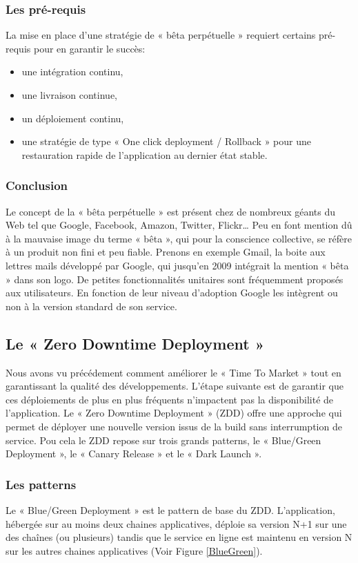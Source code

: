 \documentclass{report}
\begin{document}
        \subsubsection{Les pré-requis}
        La mise en place d’une stratégie de « bêta perpétuelle » requiert certains pré-requis pour en garantir le succès:\\
        \begin{itemize}
          \item une intégration continu,
          \item une livraison continue,
          \item un déploiement continu,
          \item une stratégie de type « One click deployment / Rollback » pour une restauration rapide de l’application au dernier état stable.\\
        \end{itemize}

        \subsubsection{Conclusion}
        Le concept de la « bêta perpétuelle » est présent chez de nombreux géants du Web tel que Google, Facebook, Amazon, Twitter, Flickr… Peu en font mention dû à la mauvaise image du terme « bêta », qui pour la conscience collective, se réfère à un produit non fini et peu fiable. Prenons en exemple Gmail, la boite aux lettres mails développé par Google, qui jusqu’en 2009 intégrait la mention « bêta » dans son logo. De petites fonctionnalités unitaires sont fréquemment proposés aux utilisateurs. En fonction de leur niveau d’adoption Google les intègrent ou non à la version standard de son service.

        \subsection{Le « Zero Downtime Deployment »}
        Nous avons vu précédement comment améliorer le « Time To Market » tout en garantissant la qualité des développements. L'étape suivante est de garantir que ces déploiements de plus en plus fréquents n'impactent pas la disponibilité de l'application. Le « Zero Downtime Deployment » (ZDD) offre une approche qui permet de déployer une nouvelle version issus de la build sans interrumption de service. Pou cela le ZDD repose sur trois grands patterns, le « Blue/Green Deployment », le « Canary Release » et le « Dark Launch ».
          \subsubsection{Les patterns}
          Le « Blue/Green Deployment » est le pattern de base du ZDD. L’application, hébergée sur au moins deux chaines applicatives, déploie sa version N+1 sur une des chaînes (ou plusieurs) tandis que le service en ligne est maintenu en version N sur les autres chaines applicatives (Voir Figure \ref{BlueGreen}).\\
\end{document}
